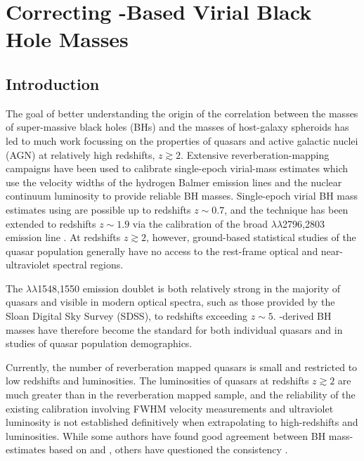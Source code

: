 
\chapter{Correcting -Based Virial Black Hole Masses}
\label{ch:bhmass}

\section{Introduction}
\label{sec:ch3-intro}

The goal of better understanding the origin of the correlation between the masses of super-massive black holes (BHs) and the masses of host-galaxy spheroids has led to much work focussing on the properties of quasars and active galactic nuclei (AGN) at relatively high redshifts, $z\gtrsim 2$. 
Extensive reverberation-mapping campaigns have been used to calibrate single-epoch virial-mass estimates which use the velocity widths of the hydrogen Balmer emission lines and the nuclear continuum luminosity to provide reliable BH masses.  
Single-epoch virial BH mass estimates using \hb are possible up to redshifts $z\sim0.7$, and the technique has been extended to redshifts $z\sim1.9$ via the calibration of the broad $\lambda\lambda$2796,2803 emission line \citep{mclure02,onken08,wang09,rafiee11}. 
At redshifts $z\gtrsim2$, however, ground-based statistical studies of the quasar population generally have no access to the rest-frame optical and near-ultraviolet spectral regions.

The $\lambda\lambda$1548,1550 emission doublet is both relatively strong in the majority of quasars and visible in modern optical spectra, such as those provided by the Sloan Digital Sky Survey (SDSS), to redshifts exceeding $z\sim5$. 
-derived BH masses have therefore become the standard \citep[e.g.][]{vestergaard06,park13} for both individual quasars and in studies of quasar population demographics.

Currently, the number of reverberation mapped quasars is small \citep[$\sim$50 quasars;][]{park13} and restricted to low redshifts and luminosities. 
The luminosities of quasars at redshifts $z\gtrsim 2$ are much greater than in the reverberation mapped sample, and the reliability of the existing calibration involving  FWHM velocity measurements and ultraviolet luminosity is not established definitively when extrapolating to high-redshifts and luminosities. 
While some authors have found good agreement between BH mass-estimates based on  and \hb \citep[e.g.][]{vestergaard06, assef11, tilton13}, others have questioned the consistency \citep[e.g.][]{baskin05,trakhtenbrot12,shen12}.

